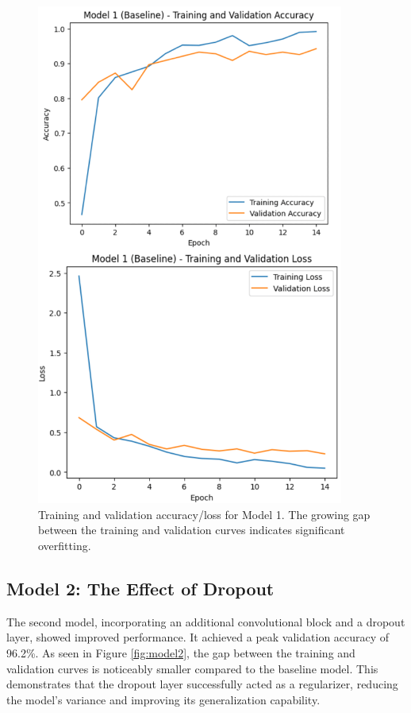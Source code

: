 \documentclass[pdflatex,sn-mathphys-num]{sn-jnl}%
\theoremstyle{thmstyleone}%
\theoremstyle{thmstyletwo}%
\theoremstyle{thmstylethree}%
\begin{document}
\begin{figure}[h]
\centering
\includegraphics[width=0.9\textwidth]{model1_curves.png}
\caption{Training and validation accuracy/loss for Model 1. The growing gap between the training and validation curves indicates significant overfitting.}\label{fig:model1}
\end{figure}

\subsection{Model 2: The Effect of Dropout}
The second model, incorporating an additional convolutional block and a dropout layer, showed improved performance. It achieved a peak validation accuracy of 96.2\%. As seen in Figure \ref{fig:model2}, the gap between the training and validation curves is noticeably smaller compared to the baseline model. This demonstrates that the dropout layer successfully acted as a regularizer, reducing the model's variance and improving its generalization capability.
\end{document}
